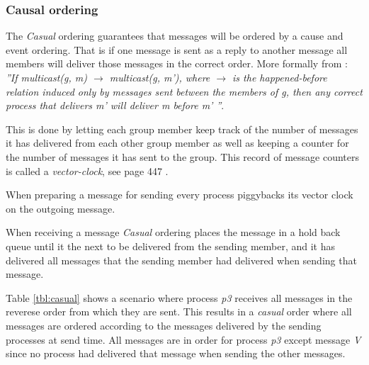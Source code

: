 \documentclass[titlepage, twocolumn, a4paper, 10pt]{article}
\begin{document}
\subsubsection{Causal ordering}\label{sec:causal}
The \textit{Casual} ordering guarantees that messages will be ordered
by a cause and event ordering. That is if one message is sent as a
reply to another message all members will deliver those messages in
the correct order. More formally from \cite{book:dist-syst}:
\textit{''If multicast(g, m) $\rightarrow$ multicast(g, m'), where
  $\rightarrow$ is the happened-before relation induced only by
  messages sent between the members of g, then any correct process
  that delivers m' will deliver m before m' ''}.

This is done by letting each group member keep track of the number of
messages it has delivered from each other group member as well as
keeping a counter for the number of messages it has sent to the group.
This record of message counters is called a \textit{vector-clock}, see
page 447 \cite{book:dist-syst}.

When preparing a message for sending every process piggybacks its
vector clock on the outgoing message.

When receiving a message \textit{Casual} ordering places the message
in a hold back queue until it the next to be delivered from the
sending member, and it has delivered all messages that the sending
member had delivered when sending that message.

Table \ref{tbl:casual} shows a scenario where process \textit{p3} receives all messages in the reverese order from which they are sent. This results in a \textit{casual} order where all messages are ordered according to the messages delivered by the sending processes at send time. All messages are in order for process \textit{p3} except message \textit{V} since no process had delivered that message when sending the other messages.
\end{document}
